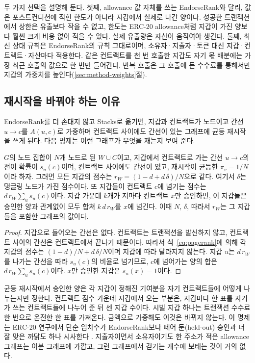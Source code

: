 두 가지 선택을 설명해 둔다. 첫째, allowance 값 자체를 쓰는 EndorseRank와 달리, 값은 포스트컨디션에 적힌 한도가 아니라 지갑에서 실제로 나간 양이다. 성공한 트랜잭션에서 상한은 유출보다 작을 수 없고, 한도는 ERC-20 allowance처럼 지갑이 가진 양보다 훨씬 크게 비용 없이 적을 수 있다. 실제 유출량은 자산이 움직여야 생긴다. 둘째, 최신 상태 규칙은 EndorseRank의 규칙 그대로이며, 소유자·지출자·토큰 대신 지갑·컨트랙트·자산마다 적용한다. 같은 컨트랙트를 천 번 호출한 지갑도 자기 몫 배분에는 가장 최근 호출의 값으로 한 번만 들어간다. 반복 호출은 그 호출에 든 수수료를 통해서만 지갑의 가중치를 높인다(\ref{sec:method-weights}절).

\subsection{재시작을 바꿔야 하는 이유}

EndorseRank를 더 손대지 않고 Stacks로 옮기면, 지갑과 컨트랙트가 노드이고 간선 $u\to c$를 $A(u,c)$로 가중하며 컨트랙트 사이에도 간선이 있는 그래프에 균등 재시작을 쓰게 된다. 다음 명제는 이런 그래프가 무엇을 재는지 보여 준다.

\begin{proposition}[균등 재시작은 지갑 수를 센다]
\label{prop:bipartite}
$G$의 노드 집합이 $N$개 노드로 된 $W\cup C$이고, 지갑에서 컨트랙트로 가는 간선 $u\to c$의 전이 확률이 $s_u(c)$이며, 컨트랙트 사이에도 간선이 있고, 재시작이 균등한 $\pi_v=1/N$이라 하자. 그러면 모든 지갑의 점수는 $r_W=(1-d+d\,\delta)/N$으로 같다. 여기서 $\delta$는 댕글링 노드가 가진 점수이다. 또 지갑들이 컨트랙트 $c$에 넘기는 점수는 $d\,r_W\sum_{u}s_u(c)$이다. 지갑 가운데 $k$개가 저마다 컨트랙트 $x$만 승인하면, 이 지갑들은 승인한 양과 관계없이 모두 합쳐 $k\,d\,r_W$를 $x$에 넘긴다. 이때 $N$, $\delta$, 따라서 $r_W$는 그 지갑들을 포함한 그래프의 값이다.
\end{proposition}

\begin{proof}
지갑으로 들어오는 간선은 없다. 컨트랙트는 트랜잭션을 발신하지 않고, 컨트랙트 사이의 간선은 컨트랙트에서 끝나기 때문이다. 따라서 식~\eqref{eq:pagerank}에 의해 각 지갑의 점수는 $(1-d)/N+d\,\delta/N$이며 지갑에 따라 달라지지 않는다. 지갑 $u$는 $d\,r_W$를 나가는 간선을 따라 $s_u(c)$의 비율로 넘기므로, $c$에 넘어가는 양의 합은 $d\,r_W\sum_u s_u(c)$이다. $x$만 승인한 지갑은 $s_u(x)=1$이다.
\end{proof}

균등 재시작에서 승인한 양은 각 지갑이 정해진 기여분을 자기 컨트랙트들에 어떻게 나누는지만 정한다. 컨트랙트 점수 가운데 지갑에서 오는 부분은, 지갑마다 한 표를 자기가 쓰는 컨트랙트들에 나누어 준 뒤 센 지갑 수이다. 시빌 지갑 하나는 트랜잭션 수수료 한 번으로 온전한 한 표를 가져온다. 금액으로 가중해도 이것은 바뀌지 않는다. 이 명제는 ERC-20 연구에서 단순 입차수가 EndorseRank보다 떼어 둔(held-out) 승인과 더 잘 맞은 까닭도 하나 시사한다 \cite{kwon2026endorserank}. 지출자이면서 소유자이기도 한 주소가 적은 allowance 그래프는 이분 그래프에 가깝고, 그런 그래프에서 걷기는 개수에 보태는 것이 거의 없다.

